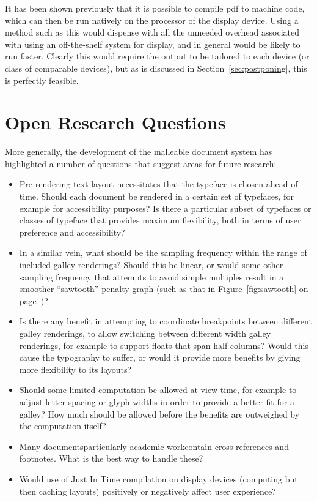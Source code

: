 It has been shown previously\hspace{0pt}\cite{Bagley2010} that it is possible to compile \gls{pdf} to machine code, which can then be run natively on the processor of the display device. Using a method such as this would dispense with all the unneeded overhead associated with using an off-the-shelf system for display, and in general would be likely to run faster. Clearly this would require the output to be tailored to each device (or class of comparable devices), but as is discussed in Section~\ref{sec:postponing}, this is perfectly feasible.



\section{Open Research Questions}

More generally, the development of the malleable document system has highlighted a number of questions that suggest areas for future research:

\begin{itemize}
 \item Pre-rendering text layout necessitates that the typeface is chosen ahead of time. Should each document be rendered in a certain set of typefaces, for example for accessibility purposes? Is there a particular subset of typefaces or classes of typeface that provides maximum flexibility, both in terms of user preference and accessibility?

\item In a similar vein, what should be the sampling frequency within the range of included galley renderings? Should this be linear, or would some other sampling frequency that attempts to avoid simple multiples result in a smoother ``sawtooth'' penalty graph (such as that in Figure~\ref{fig:sawtooth} on page~\pageref{fig:sawtooth})?

\item Is there any benefit in attempting to coordinate breakpoints between different galley renderings, to allow switching between different width galley renderings, for example to support floats that span half-columns? Would this cause the typography to suffer, or would it provide more benefits by giving more flexibility to its layouts?

\item Should some limited computation be allowed at view-time, for example to adjust letter-spacing or glyph widths in order to provide a better fit for a galley? How much should be allowed before the benefits are outweighed by the computation itself?

\item Many documents\ed particularly academic work\ed contain cross-references and footnotes. What is the best way to handle these?%

\item Would use of Just In Time compilation on display devices (\ie computing but then caching layouts) positively or negatively affect user experience?

\end{itemize}



